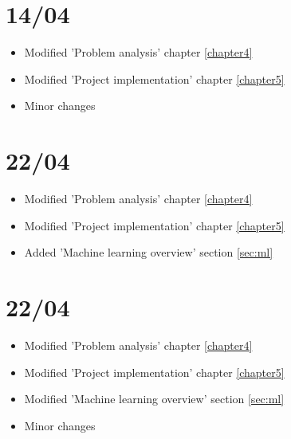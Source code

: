 \section{14/04}
\begin{itemize}
    \item Modified 'Problem analysis' chapter \ref{chapter4}
    \item Modified 'Project implementation' chapter \ref{chapter5}
    \item Minor changes
\end{itemize}

\section{22/04}
\begin{itemize}
    \item Modified 'Problem analysis' chapter \ref{chapter4}
    \item Modified 'Project implementation' chapter \ref{chapter5}
    \item Added 'Machine learning overview' section \ref{sec:ml}
\end{itemize}

\section{22/04}
\begin{itemize}
    \item Modified 'Problem analysis' chapter \ref{chapter4}
    \item Modified 'Project implementation' chapter \ref{chapter5}
    \item Modified 'Machine learning overview' section \ref{sec:ml}
    \item Minor changes
\end{itemize}